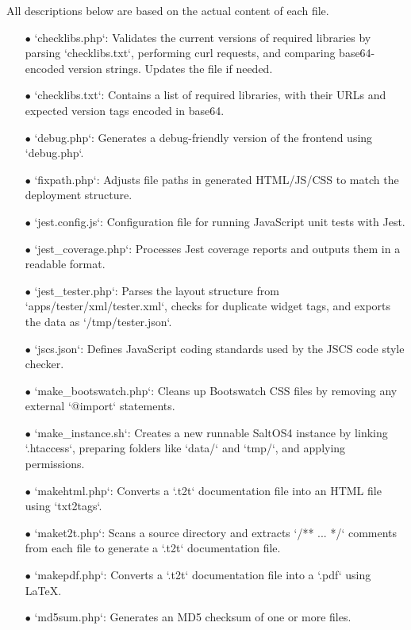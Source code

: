 \documentclass[a4paper]{article}
\begin{document}
All descriptions below are based on the actual content of each file.

\begin{itemize}
\item[\color{myblue}$\bullet$] `checklibs.php`: Validates the current versions of required libraries by parsing `checklibs.txt`, performing curl requests, and comparing base64-encoded version strings. Updates the file if needed.
\item[\color{myblue}$\bullet$] `checklibs.txt`: Contains a list of required libraries, with their URLs and expected version tags encoded in base64.
\item[\color{myblue}$\bullet$] `debug.php`: Generates a debug-friendly version of the frontend using `debug.php`.
\item[\color{myblue}$\bullet$] `fixpath.php`: Adjusts file paths in generated HTML/JS/CSS to match the deployment structure.
\item[\color{myblue}$\bullet$] `jest.config.js`: Configuration file for running JavaScript unit tests with Jest.
\item[\color{myblue}$\bullet$] `jest\_coverage.php`: Processes Jest coverage reports and outputs them in a readable format.
\item[\color{myblue}$\bullet$] `jest\_tester.php`: Parses the layout structure from `apps/tester/xml/tester.xml`, checks for duplicate widget tags, and exports the data as `/tmp/tester.json`.
\item[\color{myblue}$\bullet$] `jscs.json`: Defines JavaScript coding standards used by the JSCS code style checker.
\item[\color{myblue}$\bullet$] `make\_bootswatch.php`: Cleans up Bootswatch CSS files by removing any external `@import` statements.
\item[\color{myblue}$\bullet$] `make\_instance.sh`: Creates a new runnable SaltOS4 instance by linking `.htaccess`, preparing folders like `data/` and `tmp/`, and applying permissions.
\item[\color{myblue}$\bullet$] `makehtml.php`: Converts a `.t2t` documentation file into an HTML file using `txt2tags`.
\item[\color{myblue}$\bullet$] `maket2t.php`: Scans a source directory and extracts `/** ... */` comments from each file to generate a `.t2t` documentation file.
\item[\color{myblue}$\bullet$] `makepdf.php`: Converts a `.t2t` documentation file into a `.pdf` using LaTeX.
\item[\color{myblue}$\bullet$] `md5sum.php`: Generates an MD5 checksum of one or more files.

\end{itemize}
\end{document}
